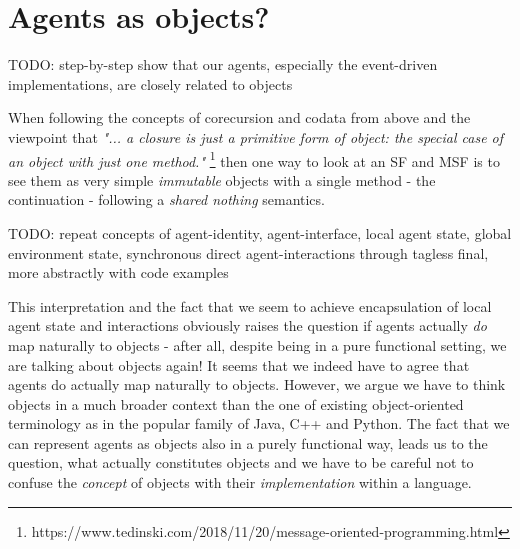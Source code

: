 
\section{Agents as objects?}
TODO: step-by-step show that our agents, especially the event-driven implementations, are closely related to objects

When following the concepts of corecursion and codata from above and the viewpoint that \textit{"... a closure is just a primitive form of object: the special case of an object with just one method."} \footnote{https://www.tedinski.com/2018/11/20/message-oriented-programming.html} then one way to look at an SF and MSF is to see them as very simple \textit{immutable} objects with a single method - the continuation - following a \textit{shared nothing} semantics. 

TODO: repeat concepts of agent-identity, agent-interface, local agent state, global environment state, synchronous direct agent-interactions through tagless final, more abstractly with code examples


This interpretation and the fact that we seem to achieve encapsulation of local agent state and interactions obviously raises the question if agents actually \textit{do} map naturally to objects - after all, despite being in a pure functional setting, we are talking about objects again! It seems that we indeed have to agree that agents do actually map naturally to objects. However, we argue we have to think objects in a much broader context than the one of existing object-oriented terminology as in the popular family of Java, C++ and Python. The fact that we can represent agents as objects also in a purely functional way, leads us to the question, what actually constitutes objects and we have to be careful not to confuse the \textit{concept} of objects with their \textit{implementation} within a language.


